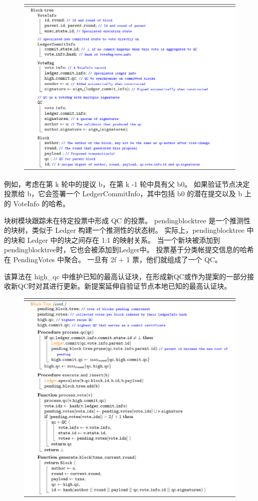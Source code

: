 \begin{figure}[H]
    \centering
    \includegraphics[width=12cm]{figures/code11.png}
\end{figure}

例如，考虑在第 k 轮中的提议 b，在第 k -1 轮中具有父 b0。 如果验证节点决定投票给 b，它会签署一个 LedgerCommitInfo，其中包括 b0 的潜在提交以及 b 上的 VoteInfo 的哈希。

块树模块跟踪未在待定投票中形成 QC 的投票。 pendingblocktree 是一个推测性的块树，类似于 Ledger 构建一个推测性的状态树。 实际上，pendingblocktree 中的块和 Ledger 中的块之间存在 1:1 的映射关系。 当一个新块被添加到pendingblocktree时，它也会被添加到Ledger中。 投票基于分类帐提交信息的哈希在 PendingVotes 中聚合。 一旦有 2f + 1 票，他们就组成了一个 QC。

该算法在 high\_qc 中维护已知的最高认证块，在形成新QC或作为提案的一部分接收新QC时对其进行更新。新提案延伸自验证节点本地已知的最高认证块。

\begin{figure}[H]
    \centering
    \includegraphics[width=12cm]{figures/code4.png}
\end{figure}

